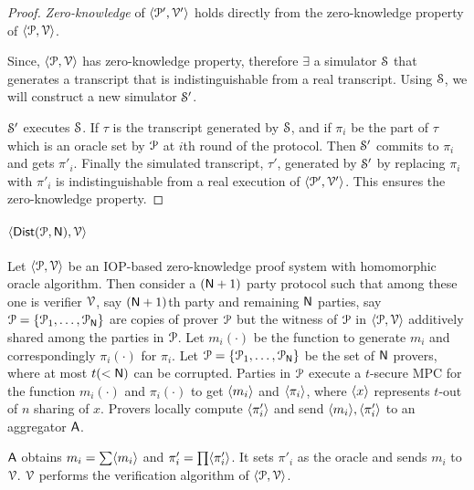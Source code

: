 \begin{proof}
	\textit{Zero-knowledge} of $\langle \mathcal{P}', \mathcal{V}' \rangle$ holds directly from the zero-knowledge property of $\langle \mathcal{P}, \mathcal{V} \rangle$. 
	
	Since, $\langle \mathcal{P}, \mathcal{V} \rangle$ has zero-knowledge property, therefore $\exists$ a simulator $\mathcal{S}$ that generates a transcript that is indistinguishable from a real transcript. Using $\mathcal{S}$, we will construct a new simulator $\mathcal{S}'$. 
	
	$\mathcal{S}'$ executes $\mathcal{S}$. If $\tau$ is the transcript generated by $\mathcal{S}$, and if $\pi_i$ be the part of $\tau$ which is an oracle set by $\mathcal{P}$ at $i$th round of the protocol. Then $\mathcal{S}'$ commits to $\pi_i$ and gets $\pi'_i$. Finally the simulated transcript, $\tau'$, generated by $\mathcal{S}'$ by replacing $\pi_i$ with $\pi'_i$ is indistinguishable from a real execution of $\langle \mathcal{P}', \mathcal{V}' \rangle$. This ensures the zero-knowledge property.
\end{proof}

\paragraph*{$\langle \mathsf{Dist}(\mathcal{P}, \mathsf{N}),\mathcal{V}\rangle$} Let $\langle \mathcal{P}, \mathcal{V} \rangle$ be an IOP-based zero-knowledge proof system with homomorphic oracle algorithm. Then consider a $(\mathsf{N} + 1)$ party protocol such that among these one is verifier $\mathcal{V}$, say $(\mathsf{N} + 1)$th party and remaining $\mathsf{N}$ parties, say $\mathcal{P} = \{ \mathcal{P}_1, \ldots, \mathcal{P}_{\mathsf{N}}\}$ are copies of prover $\mathcal{P}$ but the witness of $\mathcal{P}$ in $\langle \mathcal{P}, \mathcal{V} \rangle$ additively shared among the parties in $\mathcal{P}$. 
Let $m_i(\cdot)$ be the function to generate $m_i$ and correspondingly $\pi_i(\cdot)$ for $\pi_i$. Let $\mathcal{P} = \{\mathcal{P}_{1}, \ldots, \mathcal{P}_{\mathsf{N}}\}$ be the set of $\mathsf{N}$ provers, where at most $t (<\mathsf{N})$ can be corrupted. Parties in $\mathcal{P}$ execute a $t$-secure MPC for the function $m_i(\cdot)$ and $\pi_i(\cdot)$ to get $\langle m_i \rangle$ and $\langle \pi_i \rangle$, where $\langle x \rangle$ represents $t$-out of $n$ sharing of $x$. Provers locally compute $\langle \pi'_i \rangle$ and send $\langle m_i \rangle, \langle \pi'_i \rangle$ to an aggregator $\mathsf{A}$.

$\mathsf{A}$ obtains $m_i = \sum \langle m_i \rangle$ and $\pi'_i = \prod \langle \pi'_i \rangle$. It sets $\pi'_i$ as the oracle and sends $m_i$ to $\mathcal{V}$. $\mathcal{V}$ performs the verification algorithm of $\langle \mathcal{P}, \mathcal{V} \rangle$.

